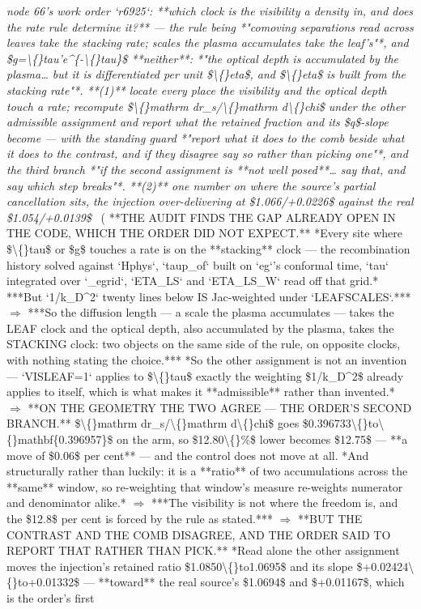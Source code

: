 \begin{description}
\textit{node 66's work order `r6925`: **which clock is the visibility a density in, and does the rate rule determine it?** --- the rule being *"comoving separations read across leaves take the stacking rate; scales the plasma accumulates take the leaf's"*, and \$g=\textbackslash\{\}tau'e\textasciicircum{}\{-\textbackslash\{\}tau\}\$ **neither**: *"the optical depth is accumulated by the plasma\ldots{} but it is differentiated per unit \$\textbackslash\{\}eta\$, and \$\textbackslash\{\}eta\$ is built from the stacking rate"*. **(1)** locate every place the visibility and the optical depth touch a rate; recompute \$\textbackslash\{\}mathrm dr\_s/\textbackslash\{\}mathrm d\textbackslash\{\}chi\$ under the other admissible assignment and report what the retained fraction and its \$q\$-slope become --- with the standing guard *"report what it does to the comb beside what it does to the contrast, and if they disagree say so rather than picking one"*, and the third branch *"if the second assignment is **not well posed**\ldots{} say that, and say which step breaks"*. **(2)** one number on where the source's partial cancellation sits, the injection over-delivering at \$1.066/+0.0226\$ against the real \$1.054/+0.0139\$} \ ( **THE AUDIT FINDS THE GAP ALREADY OPEN IN THE CODE, WHICH THE ORDER DID NOT EXPECT.** *Every site where \$\textbackslash\{\}tau\$ or \$g\$ touches a rate is on the **stacking** clock --- the recombination history solved against `Hphys`, `taup\_of` built on `eg`'s conformal time, `tau` integrated over `\_egrid`, `ETA\_LS` and `ETA\_LS\_W` read off that grid.*  ***But `1/k\_D\textasciicircum{}2` twenty lines below IS Jac-weighted under `LEAFSCALES`.*** \ensuremath{\Rightarrow} ***So the diffusion length --- a scale the plasma accumulates --- takes the LEAF clock and the optical depth, also accumulated by the plasma, takes the STACKING clock: two objects on the same side of the rule, on opposite clocks, with nothing stating the choice.***  *So the other assignment is not an invention --- `VISLEAF=1` applies to \$\textbackslash\{\}tau\$ exactly the weighting \$1/k\_D\textasciicircum{}2\$ already applies to itself, which is what makes it **admissible** rather than invented.* \ensuremath{\Rightarrow}  **ON THE GEOMETRY THE TWO AGREE --- THE ORDER'S SECOND BRANCH.** \$\textbackslash\{\}mathrm dr\_s/\textbackslash\{\}mathrm d\textbackslash\{\}chi\$ goes \$0.396733\textbackslash\{\}to\textbackslash\{\}mathbf\{0.396957\}\$ on the arm, so \$12.80\textbackslash\{\}\%\$ lower becomes \$12.75\$ --- **a move of \$0.06\$ per cent** --- and the control does not move at all. *And structurally rather than luckily: it is a **ratio** of two accumulations across the **same** window, so re-weighting that window's measure re-weights numerator and denominator alike.* \ensuremath{\Rightarrow} ***The visibility is not where the freedom is, and the \$12.8\$ per cent is forced by the rule as stated.*** \ensuremath{\Rightarrow}  **BUT THE CONTRAST AND THE COMB DISAGREE, AND THE ORDER SAID TO REPORT THAT RATHER THAN PICK.** *Read alone the other assignment moves the injection's retained ratio \$1.0850\textbackslash\{\}to1.0695\$ and its slope \$+0.02424\textbackslash\{\}to+0.01332\$ --- **toward** the real source's \$1.0694\$ and \$+0.01167\$, which is the order's first 
\end{description}
